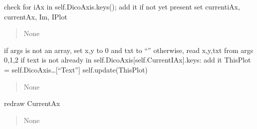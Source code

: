 \documentclass[letterpaper,10pt,english]{sphinxmanual}
\begin{document}
\begin{fulllineitems}
\begin{fulllineitems}
\label{\detokenize{api/killMS.Plot:killMS.Plot.Graph.ClassMplWidget.subplot}}
\pysigstartsignatures
{}
\pysigstopsignatures
\sphinxAtStartPar
check for iAx in self.DicoAxis.keys(); add it if not yet present
set currentiAx, currentAx, Im, IPlot
\begin{quote}\begin{description}
\sphinxAtStartPar
None

\end{description}\end{quote}

\end{fulllineitems}


\begin{fulllineitems}
\label{\detokenize{api/killMS.Plot:killMS.Plot.Graph.ClassMplWidget.text}}
\pysigstartsignatures
{}
\pysigstopsignatures
\sphinxAtStartPar
if args is not an array, set x,y to 0 and txt to “”
otherwise, read x,y,txt from args 0,1,2
if text is not already in self.DicoAxis{[}self.CurrentIAx{]}.keys: add it
ThisPlot = self.DicoAxis…{[}“Text”{]}
self.update(ThisPlot)
\begin{quote}\begin{description}
\sphinxAtStartPar
None

\end{description}\end{quote}

\end{fulllineitems}


\begin{fulllineitems}
\label{\detokenize{api/killMS.Plot:killMS.Plot.Graph.ClassMplWidget.update}}
\pysigstartsignatures
{}
\pysigstopsignatures
\sphinxAtStartPar
redraw CurrentAx
\begin{quote}\begin{description}
\sphinxAtStartPar
None


\end{description}
\end{quote}
\end{fulllineitems}
\end{fulllineitems}
\end{document}
